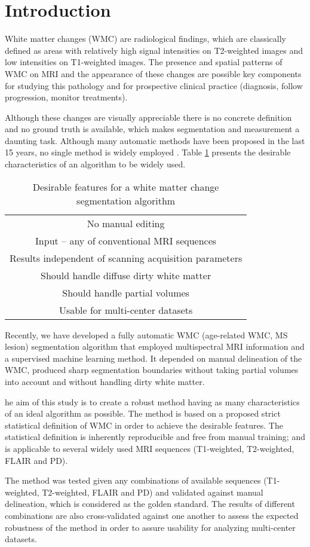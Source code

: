 \section{Introduction}


White matter changes (WMC) are radiological findings, which are classically defined as areas with relatively high signal intensities on T2-weighted images and low intensities on T1-weighted images. The presence and spatial patterns of WMC on MRI and the appearance of these changes are possible key components for studying this pathology and for prospective clinical practice (diagnosis, follow progression, monitor treatments).

Although these changes are visually appreciable there is no concrete definition and no ground truth is available, which makes segmentation and measurement a daunting task. Although many automatic methods have been proposed in the last 15 years, no single method is widely employed \cite{GarciaReview}. Table \ref{Table:Requirements} presents the desirable characteristics of an algorithm to be widely used.

\begin{table} 
    \begin{tabular}{ c }
        No manual editing \\ 
        Input – any of conventional MRI sequences \\ 
        Results independent of scanning acquisition parameters \\ 
        Should handle diffuse dirty white matter \\ 
        Should handle partial volumes \\ 
        Usable for multi-center datasets \\ 
    \end{tabular} 
    \caption{Desirable features for a white matter change segmentation algorithm } 
    \label{Table:Requirements}
\end{table}
    
Recently, we have developed a fully automatic WMC (age-related WMC, MS lesion) segmentation algorithm \cite{CascadeOrig} that employed multispectral MRI information and a supervised machine learning method. It depended on manual delineation of the WMC, produced sharp segmentation boundaries without taking partial volumes into account and without handling dirty white matter.
    
he aim of this study is to create a robust method having as many characteristics of an ideal algorithm as possible. The method is based on a proposed strict statistical definition of WMC in order to achieve the desirable features. The statistical definition is inherently reproducible and free from manual training; and is applicable to several widely used MRI sequences (T1-weighted, T2-weighted, FLAIR and PD).

The method was tested given any combinations of available sequences (T1-weighted, T2-weighted, FLAIR and PD) and validated against manual delineation, which is considered as the golden standard. The results of different combinations are also cross-validated against one another to assess the expected robustness of the method in order to assure usability for analyzing multi-center datasets.
    
    
  